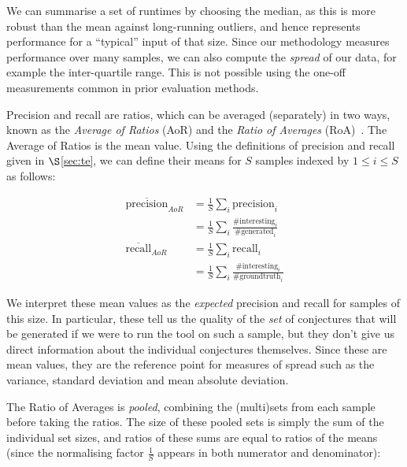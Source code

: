We can summarise a set of runtimes by choosing the median, as this is more
robust than the mean against long-running outliers, and hence represents
performance for a ``typical'' input of that size. Since our methodology measures
performance over many samples, we can also compute the \emph{spread} of our
data, for example the inter-quartile range. This is not possible using the
one-off measurements common in prior evaluation methods.

Precision and recall are ratios, which can be averaged (separately) in two ways,
known as the \emph{Average of Ratios} (AoR) and the \emph{Ratio of Averages}
(RoA)~\cite{egghe2012averages}. The Average of Ratios is the mean value. Using
the definitions of precision and recall given in $\S$\ref{sec:te}, we can define
their means for $S$ samples indexed by $1 \leq i \leq S$ as follows:

\begin{align*}
       \overline{\text{precision}}_{AoR}
    &= \frac{1}{S} \sum_i{\text{precision}_i} \\
    &= \frac{1}{S} \sum_i{
         \frac{\#\text{interesting}_i}
              {\#\text{generated}_i}}         \\[10pt]
       \overline{\text{recall}}_{AoR}
    &= \frac{1}{S} \sum_i{\text{recall}_i} \\
    &= \frac{1}{S} \sum_i{
         \frac{\#\text{interesting}_i}
              {\#\text{groundtruth}_i}}
\end{align*}

We interpret these mean values as the \emph{expected} precision and recall for
samples of this size. In particular, these tell us the quality of the \emph{set}
of conjectures that will be generated if we were to run the tool on such a
sample, but they don't give us direct information about the individual
conjectures themselves. Since these are mean values, they are the reference
point for measures of spread such as the variance, standard deviation and mean
absolute deviation.

The Ratio of Averages is \emph{pooled}, combining the (multi)sets from each
sample before taking the ratios. The size of these pooled sets is simply the sum
of the individual set sizes, and ratios of these sums are equal to ratios of the
means (since the normalising factor $\frac{1}{S}$ appears in both numerator and
denominator):

